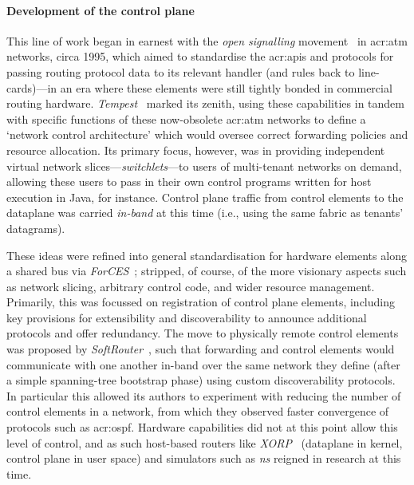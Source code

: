 \paragraph{Development of the control plane}
This line of work began in earnest with the \emph{open signalling} movement~\parencite{DBLP:journals/ccr/CampbellKMV99} in \gls{acr:atm} networks, circa 1995, which aimed to standardise the \glspl{acr:api} and protocols for passing routing protocol data to its relevant handler (and rules back to line-cards)---in an era where these elements were still tightly bonded in commercial routing hardware.
\emph{Tempest}~\parencite{DBLP:journals/network/MerweRLC98} marked its zenith, using these capabilities in tandem with specific functions of these now-obsolete \gls{acr:atm} networks to define a `network control architecture' which would oversee correct forwarding policies and resource allocation.
Its primary focus, however, was in providing independent virtual network slices---\emph{switchlets}---to users of multi-tenant networks on demand, allowing these users to pass in their own control programs written for host execution in Java, for instance.
Control plane traffic from control elements to the dataplane was carried \emph{in-band} at this time (i.e., using the same fabric as tenants' datagrams).

%
%

These ideas were refined into general standardisation for hardware elements along a shared bus via \emph{ForCES}~\parencite{rfc3746}; stripped, of course, of the more visionary aspects such as network slicing, arbitrary control code, and wider resource management.
Primarily, this was focussed on registration of control plane elements, including key provisions for extensibility and discoverability to announce additional protocols and offer redundancy.
The move to physically remote control elements was proposed by \emph{SoftRouter}~\parencite{lakshman2004the}, such that forwarding and control elements would communicate with one another in-band over the same network they define (after a simple spanning-tree bootstrap phase) using custom discoverability protocols.
In particular this allowed its authors to experiment with reducing the number of control elements in a network, from which they observed faster convergence of protocols such as \gls{acr:ospf}.
Hardware capabilities did not at this point allow this level of control, and as such host-based routers like \emph{XORP}~\parencite{DBLP:journals/ccr/HandleyHK03} (dataplane in kernel, control plane in user space) and simulators such as \emph{ns} reigned in research at this time.

